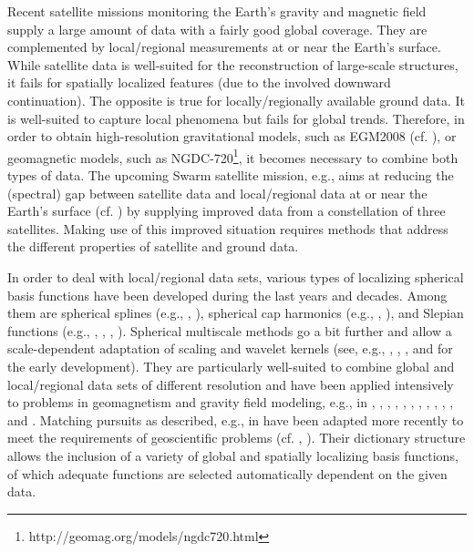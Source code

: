 \documentclass[a4paper, 10pt]{article}
\numberwithin{equation}{section}
\theoremstyle{definition}
\begin{document}
Recent satellite missions monitoring the Earth's gravity and magnetic field supply a large amount of data with a fairly good global coverage. They are complemented by local/regional measurements at or near the Earth's surface. While satellite data is well-suited for the reconstruction of large-scale structures, it fails for spatially localized features (due to the involved downward continuation). The opposite is true for locally/regionally available ground data. It is well-suited to capture local phenomena but fails for global trends. Therefore, in order to obtain high-resolution gravitational models, such as EGM2008 (cf. \cite{pavlis}), or geomagnetic models, such as NGDC-720\footnote{http://geomag.org/models/ngdc720.html}, it becomes necessary to combine both types of data. The upcoming Swarm satellite mission, e.g., aims at reducing the (spectral) gap between satellite data and local/regional data at or near the Earth's surface (cf. \cite{swarm}) by supplying improved data from a constellation of three satellites. Making use of this improved situation requires methods that address the different properties of satellite and ground data. 

In order to deal with local/regional data sets, various types of localizing spherical basis functions have been developed during the last years and decades. Among them are spherical splines (e.g., \cite{freeden81}, \cite{shure82}), spherical cap harmonics (e.g., \cite{haines85}, \cite{thebault}), and Slepian functions (e.g., \cite{plattner13}, \cite{plattner13b}, \cite{simons06}, \cite{simons10}). Spherical multiscale methods go a bit further and allow a scale-dependent adaptation of scaling and wavelet kernels (see, e.g., \cite{dahlke}, \cite{freewind}, \cite{hol}, and \cite{sweldens} for the early development). They are particularly well-suited to combine global and local/regional data sets of different resolution and have been applied intensively to problems in geomagnetism and gravity field modeling, e.g., 
in \cite{bayer01}, \cite{chambodut}, \cite{freeger}, \cite{freeschrei06}, \cite{freewind}, \cite{ger12}, \cite{ger13}, \cite{hol03}, \cite{klees07}, \cite{mai05}, \cite{mayer06}, and \cite{michel01}. Matching pursuits as described, e.g., in \cite{mallat} have been adapted more recently to meet the requirements of geoscientific problems (cf. \cite{michel12}, \cite{fischer13}). Their dictionary structure allows the inclusion of a variety of global and spatially localizing basis functions, of which adequate functions are selected automatically dependent on the given data.
\end{document}
